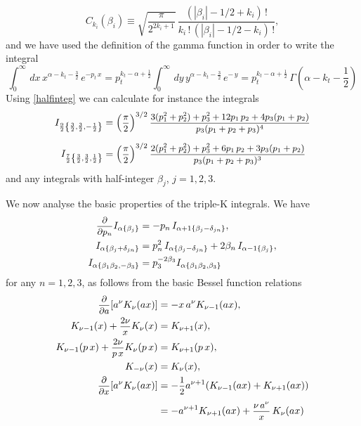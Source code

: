 \documentclass[a4paper,11pt,openright,twoside]{book}
\let\a=\alpha   \let\b=\beta   \let\g=\gamma   \let\d=\delta
\let\n=\nu      \let\x=\xi     \let\p=\pi      \let\r=\rho
\let\G=\Gamma  \let\D=\Delta \let\Q=\Theta  \let\L=\Lambda
\newcommand{\sdfrac}[2]{\mbox{\small$\displaystyle\frac{#1}{#2}$}}
\numberwithin{equation}{section}
\begin{document}
{{\begin{equation}
	C_{k_i}(\b_i)\equiv \sqrt{\frac{\pi}{2^{2k_i+1}}}\,\frac{\left(|\b_i|-1/2+k_i\right)\,!}{k_i\,!\,\left(|\b_i|-1/2-k_i\right)\,!},
\end{equation}
and we have used the definition of the gamma function in order to write the integral
\begin{equation}
	\int_0^\infty\,dx\,x^{\a-k_t-\frac{3}{2}}\,e^{-p_t\,x}=p_t^{k_t-\a+\frac{1}{2}}\int_0^\infty\,dy\,y^{\a-k_t-\frac{3}{2}}\,e^{-\,y}=p_t^{k_t-\a+\frac{1}{2}}\,\G\left(\a-k_t-\frac{1}{2}\right)
\end{equation}
Using \eqref{halfinteg} we can calculate for instance the integrals
\begin{align}
	I_{\frac{9}{2}\left\{\frac{3}{2},\frac{3}{2},-\frac{1}{2}\right\}}&=\left(\sdfrac{\pi}{2}\right)^{3/2}\sdfrac{3(p_1^2+p_2^2)+p_3^2+12p_1\,p_2+4p_3(p_1+p_2)}{p_3(p_1+p_2+p_3)^4}\\[1.2ex]
	I_{\frac{7}{2}\left\{\frac{3}{2},\frac{3}{2},\frac{1}{2}\right\}}&=\left(\sdfrac{\pi}{2}\right)^{3/2}\sdfrac{2(p_1^2+p_2^2)+p_3^2+6 p_1\,p_2+3p_3(p_1+p_2)}{p_3(p_1+p_2+p_3)^3}
\end{align}
and any integrals with half-integer $\b_j$, $j=1,2,3$.

We now analyse the basic properties of the triple-K integrals. We have
\begin{equation}
	\begin{split}
		\sdfrac{\partial}{\partial p_n}I_{\a\{\b_j\}}&=-p_n\,I_{\a+1\{\b_j-\d_{jn}\}},\\
		I_{\a\{\b_j+\d_{jn}\}}&=p_n^2\,I_{\a\{\b_j-\d_{jn}\}}+2\b_n\,I_{\a-1\{\b_j\}},\\
		I_{\a\{\b_1\b_2,-\b_3\}}&=p_3^{-2\b_3}I_{\a\{\b_1\b_2,\b_3\}}
	\end{split}\label{identityBess}
\end{equation}
for any $n=1,2,3$, as follows from the basic Bessel function relations
\begin{align}
	\sdfrac{\partial}{\partial a}[a^\n K_\n(ax)]&=-x\,a^\n K_{\n-1}(ax),\\
	K_{\n-1}(x)+\sdfrac{2\n}{x}K_\n(x)&=K_{\n+1}(x),\\
	K_{\n-1}(p\,x)+\sdfrac{2\n}{p\,x}K_\n(p\,x)&=K_{\n+1}(p\,x),\\
	K_{-\n}(x)&=K_{\n}(x),\\
	\sdfrac{\partial}{\partial x}[a^\n K_\n(ax)]&=-\sdfrac{1}{2}a^{\n+1} (K_{\n-1}(ax)+K_{\n+1}(ax))\notag\\[0.8ex]
	&=-a^{\n+1}K_{\n+1}(ax)+\sdfrac{\n\,a^\n}{x}\,K_{\n}(ax)
\end{align}

}}
\end{document}

